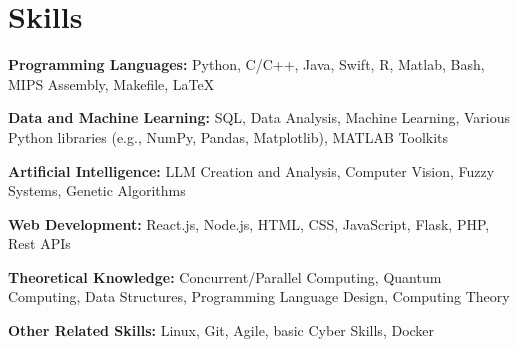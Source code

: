 \section*{Skills}
\textbf{Programming Languages:} Python, C/C++, Java, Swift, R, Matlab, Bash, MIPS Assembly, Makefile, LaTeX

\textbf{Data and Machine Learning:} SQL, Data Analysis, Machine Learning, Various Python libraries (e.g., NumPy, Pandas, Matplotlib), MATLAB Toolkits

\textbf{Artificial Intelligence:} LLM Creation and Analysis, Computer Vision, Fuzzy Systems, Genetic Algorithms

\textbf{Web Development:} React.js, Node.js, HTML, CSS, JavaScript, Flask, PHP, Rest APIs

\textbf{Theoretical Knowledge:} Concurrent/Parallel Computing, Quantum Computing, Data Structures, Programming Language Design, Computing Theory

\textbf{Other Related Skills:} Linux, Git, Agile, basic Cyber Skills, Docker

